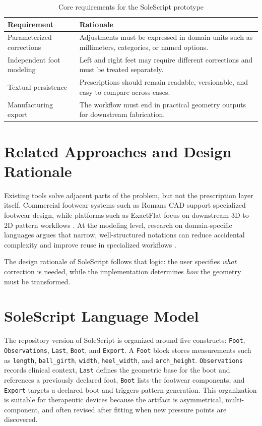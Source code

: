 \documentclass[12pt,a4paper]{article}
\begin{document}
\begin{table}[h!]
\centering
\caption{Core requirements for the SoleScript prototype}
{\fontsize{10pt}{12pt}\selectfont
\begin{tabular}{p{4.1cm}p{9.4cm}}
\toprule
\textbf{Requirement} & \textbf{Rationale} \\
\midrule
Parameterized corrections & Adjustments must be expressed in domain units such as millimeters, categories, or named options. \\
Independent foot modeling & Left and right feet may require different corrections and must be treated separately. \\
Textual persistence & Prescriptions should remain readable, versionable, and easy to compare across cases. \\
Manufacturing export & The workflow must end in practical geometry outputs for downstream fabrication. \\
\bottomrule
\end{tabular}
}
\end{table}

\section{Related Approaches and Design Rationale}
Existing tools solve adjacent parts of the problem, but not the prescription layer itself. Commercial footwear systems such as Romans CAD support specialized footwear design, while platforms such as ExactFlat focus on downstream 3D-to-2D pattern workflows \cite{romanscad,exactflat}. At the modeling level, research on domain-specific languages argues that narrow, well-structured notations can reduce accidental complexity and improve reuse in specialized workflows \cite{ameur2023methodological,dsmcore}.

The design rationale of SoleScript follows that logic: the user specifies \textit{what} correction is needed, while the implementation determines \textit{how} the geometry must be transformed.

\section{SoleScript Language Model}
The repository version of SoleScript is organized around five constructs: \texttt{Foot}, \texttt{Observations}, \texttt{Last}, \texttt{Boot}, and \texttt{Export}. A \texttt{Foot} block stores measurements such as \texttt{length}, \texttt{ball\_girth}, \texttt{width}, \texttt{heel\_width}, and \texttt{arch\_height}. \texttt{Observations} records clinical context, \texttt{Last} defines the geometric base for the boot and references a previously declared foot, \texttt{Boot} lists the footwear components, and \texttt{Export} targets a declared boot and triggers pattern generation. This organization is suitable for therapeutic devices because the artifact is asymmetrical, multi-component, and often revised after fitting when new pressure points are discovered.
\end{document}
